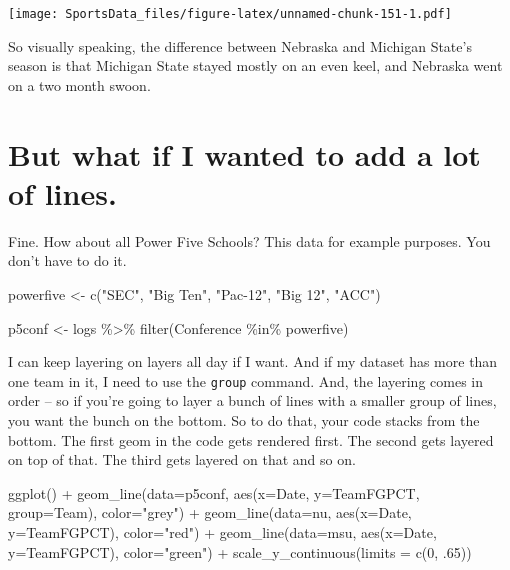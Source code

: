 \documentclass[
]{book}
\newenvironment{Shaded}{\begin{snugshade}}{\end{snugshade}}
\newcommand{\AttributeTok}[1]{\textcolor[rgb]{0.77,0.63,0.00}{#1}}
\newcommand{\DecValTok}[1]{\textcolor[rgb]{0.00,0.00,0.81}{#1}}
\newcommand{\FunctionTok}[1]{\textcolor[rgb]{0.00,0.00,0.00}{#1}}
\newcommand{\NormalTok}[1]{#1}
\newcommand{\OtherTok}[1]{\textcolor[rgb]{0.56,0.35,0.01}{#1}}
\newcommand{\SpecialCharTok}[1]{\textcolor[rgb]{0.00,0.00,0.00}{#1}}
\newcommand{\StringTok}[1]{\textcolor[rgb]{0.31,0.60,0.02}{#1}}
\begin{document}
\texttt{[image: SportsData\_files/figure-latex/unnamed-chunk-151-1.pdf]}

So visually speaking, the difference between Nebraska and Michigan State's season is that Michigan State stayed mostly on an even keel, and Nebraska went on a two month swoon.

\hypertarget{but-what-if-i-wanted-to-add-a-lot-of-lines.}{%
\section{But what if I wanted to add a lot of lines.}\label{but-what-if-i-wanted-to-add-a-lot-of-lines.}}

Fine. How about all Power Five Schools? This data for example purposes. You don't have to do it.

\begin{Shaded}
\begin{Highlighting}[]
\NormalTok{powerfive }\OtherTok{\textless{}{-}} \FunctionTok{c}\NormalTok{(}\StringTok{"SEC"}\NormalTok{, }\StringTok{"Big Ten"}\NormalTok{, }\StringTok{"Pac{-}12"}\NormalTok{, }\StringTok{"Big 12"}\NormalTok{, }\StringTok{"ACC"}\NormalTok{)}

\NormalTok{p5conf }\OtherTok{\textless{}{-}}\NormalTok{ logs }\SpecialCharTok{\%\textgreater{}\%} \FunctionTok{filter}\NormalTok{(Conference }\SpecialCharTok{\%in\%}\NormalTok{ powerfive)}
\end{Highlighting}
\end{Shaded}

I can keep layering on layers all day if I want. And if my dataset has more than one team in it, I need to use the \texttt{group} command. And, the layering comes in order -- so if you're going to layer a bunch of lines with a smaller group of lines, you want the bunch on the bottom. So to do that, your code stacks from the bottom. The first geom in the code gets rendered first. The second gets layered on top of that. The third gets layered on that and so on.

\begin{Shaded}
\begin{Highlighting}[]
\FunctionTok{ggplot}\NormalTok{() }\SpecialCharTok{+} \FunctionTok{geom\_line}\NormalTok{(}\AttributeTok{data=}\NormalTok{p5conf, }\FunctionTok{aes}\NormalTok{(}\AttributeTok{x=}\NormalTok{Date, }\AttributeTok{y=}\NormalTok{TeamFGPCT, }\AttributeTok{group=}\NormalTok{Team), }\AttributeTok{color=}\StringTok{"grey"}\NormalTok{) }\SpecialCharTok{+} \FunctionTok{geom\_line}\NormalTok{(}\AttributeTok{data=}\NormalTok{nu, }\FunctionTok{aes}\NormalTok{(}\AttributeTok{x=}\NormalTok{Date, }\AttributeTok{y=}\NormalTok{TeamFGPCT), }\AttributeTok{color=}\StringTok{"red"}\NormalTok{) }\SpecialCharTok{+} \FunctionTok{geom\_line}\NormalTok{(}\AttributeTok{data=}\NormalTok{msu, }\FunctionTok{aes}\NormalTok{(}\AttributeTok{x=}\NormalTok{Date, }\AttributeTok{y=}\NormalTok{TeamFGPCT), }\AttributeTok{color=}\StringTok{"green"}\NormalTok{) }\SpecialCharTok{+} \FunctionTok{scale\_y\_continuous}\NormalTok{(}\AttributeTok{limits =} \FunctionTok{c}\NormalTok{(}\DecValTok{0}\NormalTok{, .}\DecValTok{65}\NormalTok{))}
\end{Highlighting}
\end{Shaded}
\end{document}
